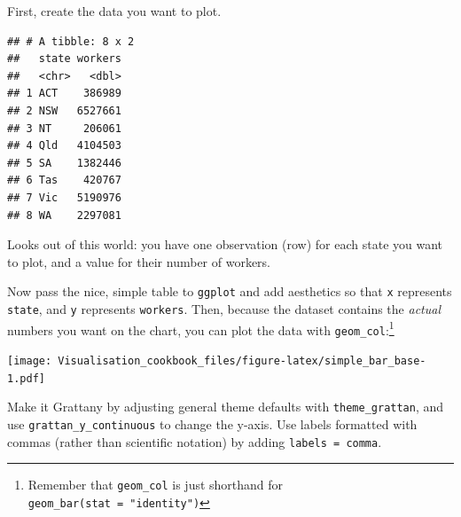 \documentclass[]{book}
\newenvironment{Shaded}{\begin{snugshade}}{\end{snugshade}}
\newcommand{\DataTypeTok}[1]{\textcolor[rgb]{0.13,0.29,0.53}{#1}}
\newcommand{\DecValTok}[1]{\textcolor[rgb]{0.00,0.00,0.81}{#1}}
\newcommand{\KeywordTok}[1]{\textcolor[rgb]{0.13,0.29,0.53}{\textbf{#1}}}
\newcommand{\NormalTok}[1]{#1}
\newcommand{\OperatorTok}[1]{\textcolor[rgb]{0.81,0.36,0.00}{\textbf{#1}}}
\newcommand{\StringTok}[1]{\textcolor[rgb]{0.31,0.60,0.02}{#1}}
\begin{document}
First, create the data you want to plot.

\begin{Shaded}
\end{Shaded}

\begin{verbatim}
## # A tibble: 8 x 2
##   state workers
##   <chr>   <dbl>
## 1 ACT    386989
## 2 NSW   6527661
## 3 NT     206061
## 4 Qld   4104503
## 5 SA    1382446
## 6 Tas    420767
## 7 Vic   5190976
## 8 WA    2297081
\end{verbatim}

Looks out of this world: you have one observation (row) for each state you want to plot, and a value for their number of workers.

Now pass the nice, simple table to \texttt{ggplot} and add aesthetics so that \texttt{x} represents \texttt{state}, and \texttt{y} represents \texttt{workers}. Then, because the dataset contains the \emph{actual} numbers you want on the chart, you can plot the data with \texttt{geom\_col}:\footnote{Remember that \texttt{geom\_col} is just shorthand for \texttt{geom\_bar(stat\ =\ "identity")}}

\begin{Shaded}
\end{Shaded}

\texttt{[image: Visualisation\_cookbook\_files/figure-latex/simple\_bar\_base-1.pdf]}

Make it Grattany by adjusting general theme defaults with \texttt{theme\_grattan}, and use \texttt{grattan\_y\_continuous} to change the y-axis. Use labels formatted with commas (rather than scientific notation) by adding \texttt{labels\ =\ comma}.
\end{document}
